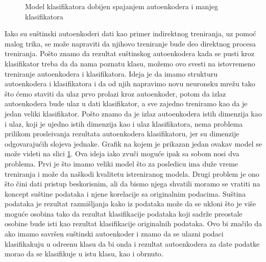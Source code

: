 \documentclass{article}
\begin{document}
\begin{figure}[h!]
		\caption{Model klasifikatora dobijen spajanjem autoenkodera i manjeg klasifikatora}
		\label{autoencoder-classifier-model-combination}
	\end{figure}

	Iako su su\v stinski autoenkoderi dati kao primer indirektnog treniranja, uz pomo\'c malog trika, se mo\v ze napraviti da njihovo treniranje bude deo direktnog procesa treniranja.
	Po\v sto znamo da rezultat su\v stinskog autoenkodera kada se pusti kroz klasifikator treba da da nama poznatu klasu, mo\v zemo ovo svesti na istovremeno treniranje autoenkodera i klasifikatora.
	Ideja je da imamo strukturu autoenkodera i klasifikatora i da od njih napravimo novu neuronsku mre\v zu tako \v sto \'cemo staviti da ulaz prvo prolazi kroz autoenkoder, potom da izlaz autoenkodera bude ulaz u dati klasifikator, a sve zajedno treniramo kao da je jedan veliki klasifikator.
	Po\v sto znamo da je izlaz autoenkodera istih dimenzija kao i ulaz, koji je ujedno istih dimenzija kao i ulaz klasifikatora, nema problema prilikom prosle\dj ivanja rezultata autoenkodera klasifikatoru, jer su dimenzije odgovaraju\'cih slojeva jednake.
	Grafik na kojem je prikazan jedan ovakav model se mo\v ze videti na slici \ref{autoencoder-classifier-model-combination}.
	Ova ideja iako zvu\v ci mogu\'ce ipak sa sobom nosi dva problema.
	Prvi je \v sto imamo veliki model \v sto za posledicu ima du\v ze vreme treniranja i mo\v ze da na\v skodi kvalitetu istreniranog modela.
	Drugi problem je ono \v sto \v cini dati pristup beskorisnim, ali da bismo njega shvatili moramo se vratiti na koncept su\v stine podataka i njene korelacije sa originalnim podacima.
	Su\v stina podataka je rezultat razmi\v sljanja kako iz podataka mo\v ze da se ukloni \v sto je vi\v se mogu\'ce osobina tako da rezultat klasifikacije podataka koji sadr\v ze preostale osobine bude isti kao rezultat klasifikacije originalnih podataka.
	Ovo bi zna\v cilo da ako imamo savr\v sen su\v stinski autoenkoder i znamo da se ulazni podaci klasifikakuju u odre\dj enu klasu da bi onda i rezultat autoenkodera za date podatke morao da se klasifikuje u istu klasu, kao i obrnuto.
\end{document}
